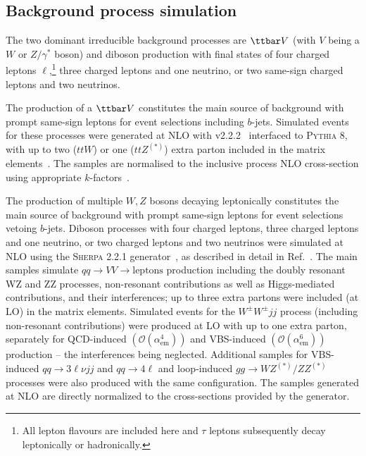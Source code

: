 \subsection*{Background process simulation}

The two dominant irreducible background processes are $\ttbar V$ (with $V$ being a $W$ or $Z/\gamma^*$ boson) 
and diboson production with final states of four charged leptons $\ell$,\footnote{All lepton flavours are included here and $\tau$
leptons subsequently decay leptonically or hadronically.} three charged leptons and one neutrino, or 
two same-sign charged leptons and two neutrinos. 

The production of a $\ttbar V$ 
constitutes the main source of background with prompt same-sign leptons for event selections including $b$-jets. 
Simulated events for these processes were generated at NLO with \AMCATNLO v2.2.2~\cite{Alwall:2014hca} interfaced to \textsc{Pythia} 8,
with up to two ($ttW$) or one ($ttZ^{(*)}$) extra parton included in the matrix elements~\cite{ATL-PHYS-PUB-2016-005}. 
The samples are normalised to the inclusive process NLO cross-section using appropriate $k$-factors~\cite{Alwall:2014hca}.

The production of multiple $W,Z$ bosons decaying leptonically 
constitutes the main source of background with prompt same-sign leptons for event selections vetoing $b$-jets. 
Diboson processes with four charged leptons, three charged leptons and one neutrino, or two charged leptons and two neutrinos 
were simulated at NLO using the \textsc{Sherpa} 2.2.1 generator~\cite{gleisberg:2008ta}, as described in detail in Ref.~\cite{ATL-PHYS-PUB-2016-002}. 
The main samples simulate $qq \to VV\to\text{leptons}$ production including the doubly resonant WZ and ZZ processes, 
non-resonant contributions as well as Higgs-mediated contributions, and their interferences; 
up to three extra partons were included (at LO) in the matrix elements. 
Simulated events for the $W^\pm W^\pm jj$ process (including non-resonant contributions) were produced at LO with up to one extra parton, 
separately for QCD-induced $\left(\mathcal{O}(\alpha_\text{em}^4)\right)$ 
and VBS-induced $\left(\mathcal{O}(\alpha_\text{em}^6)\right)$ production -- the interferences being neglected. 
Additional samples for VBS-induced $qq\to 3\ell\nu jj$ and $qq\to 4\ell$ and loop-induced $gg\to WZ^{(*)}/ZZ^{(*)}$ processes
were also produced with the same configuration.
The samples generated at NLO are directly normalized to the cross-sections provided by the generator. 

